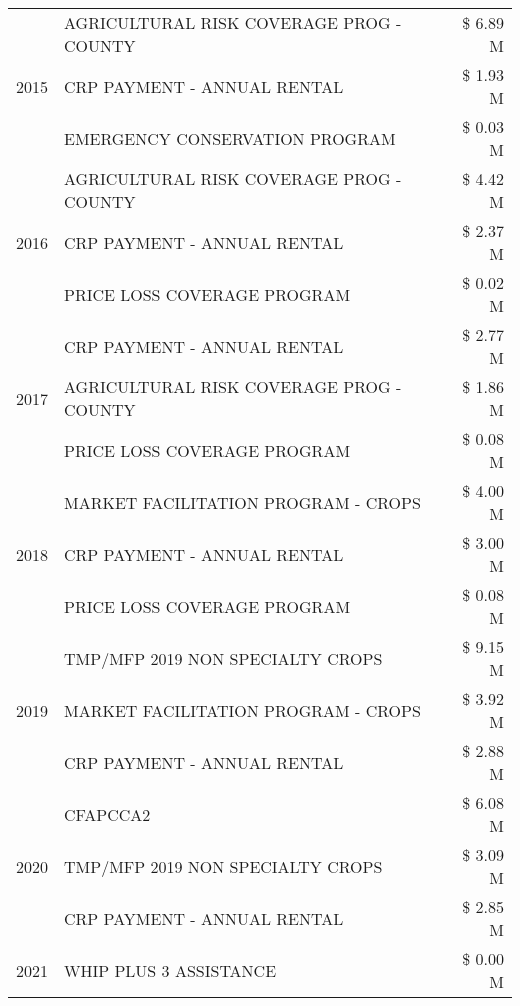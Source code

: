 \begin{tabular}{llr}
\multirow[t]{3}{*}{2015} & AGRICULTURAL RISK COVERAGE PROG - COUNTY & \$ 6.89 M \\
 & CRP PAYMENT - ANNUAL RENTAL & \$ 1.93 M \\
 & EMERGENCY CONSERVATION PROGRAM & \$ 0.03 M \\
\cline{1-3}
\multirow[t]{3}{*}{2016} & AGRICULTURAL RISK COVERAGE PROG - COUNTY & \$ 4.42 M \\
 & CRP PAYMENT - ANNUAL RENTAL & \$ 2.37 M \\
 & PRICE LOSS COVERAGE PROGRAM & \$ 0.02 M \\
\cline{1-3}
\multirow[t]{3}{*}{2017} & CRP PAYMENT - ANNUAL RENTAL & \$ 2.77 M \\
 & AGRICULTURAL RISK COVERAGE PROG - COUNTY & \$ 1.86 M \\
 & PRICE LOSS COVERAGE PROGRAM & \$ 0.08 M \\
\cline{1-3}
\multirow[t]{3}{*}{2018} & MARKET FACILITATION PROGRAM - CROPS & \$ 4.00 M \\
 & CRP PAYMENT - ANNUAL RENTAL & \$ 3.00 M \\
 & PRICE LOSS COVERAGE PROGRAM & \$ 0.08 M \\
\cline{1-3}
\multirow[t]{3}{*}{2019} & TMP/MFP 2019 NON SPECIALTY CROPS & \$ 9.15 M \\
 & MARKET FACILITATION PROGRAM - CROPS & \$ 3.92 M \\
 & CRP PAYMENT - ANNUAL RENTAL & \$ 2.88 M \\
\cline{1-3}
\multirow[t]{3}{*}{2020} & CFAPCCA2 & \$ 6.08 M \\
 & TMP/MFP 2019 NON SPECIALTY CROPS & \$ 3.09 M \\
 & CRP PAYMENT - ANNUAL RENTAL & \$ 2.85 M \\
\cline{1-3}
2021 & WHIP PLUS 3 ASSISTANCE & \$ 0.00 M \\
\cline{1-3}
\bottomrule
\end{tabular}
